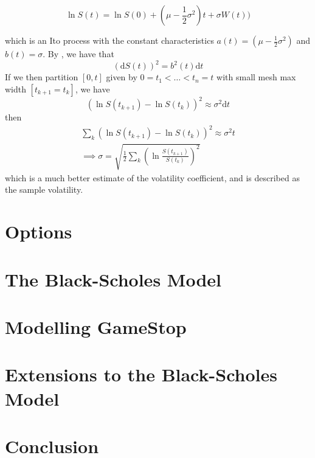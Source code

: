 \documentclass[11pt]{article} %
\begin{document}
\begin{equation}
    \ln{S(t)} = \ln{S(0)} + (\mu - \frac{1}{2}\sigma^2)t + \sigma W(t))
\end{equation}

which is an Ito process with the constant characteristics $a(t) = (\mu - \frac{1}{2}\sigma^2)$
 and $b(t) = \sigma$. By \cite{quadtraticvariation}, we have that
 \begin{equation}
     (\mathrm{d}S(t))^2 = b^2(t) \mathrm{d}t
 \end{equation}
 If we then partition $[0,t]$ given by $0 = t_1 < \dots < t_n = t$ with small mesh max 
 width $[t_{k+1} = t_k]$, we have 
 \begin{equation}
     (\ln{S(t_{k+1}) - \ln{S(t_k)}})^2 \approx \sigma^2 \mathrm{d}t
 \end{equation}
then 
\begin{align}
    \sum_k (\ln{S(t_{k+1}) - \ln{S(t_k)}})^2 \approx \sigma^2 t\\
    \implies
    \sigma = \sqrt{\frac{1}{2}\sum_k (\ln{\frac{S(t_{k+1})}{S(t_k)}})^2}
\end{align}
which is a much better estimate of the volatility coefficient, and is described as the 
sample volatility.
\section{Options}

\section{The Black-Scholes Model}

\section{Modelling GameStop}

\section{Extensions to the Black-Scholes Model}

\section{Conclusion}

\printbibliography %
\end{document}
